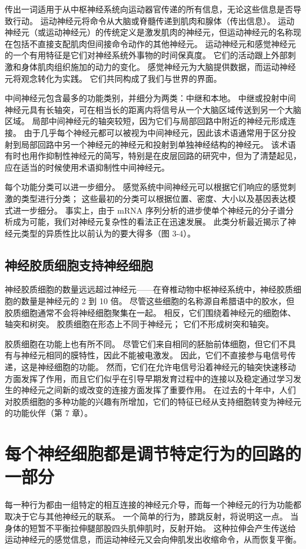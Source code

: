 传出一词适用于从中枢神经系统向运动器官传递的所有信息，无论这些信息是否导致行动。 运动神经元将命令从大脑或脊髓传递到肌肉和腺体（传出信息）。 运动神经元（或运动神经元）的传统定义是激发肌肉的神经元，但运动神经元的名称现在包括不直接支配肌肉但间接命令动作的其他神经元。 运动神经元和感觉神经元的一个有用特征是它们对神经系统外事物的时间保真度。 它们的活动跟上外部刺激和身体肌肉组织施加的动力的变化。 感觉神经元为大脑提供数据，而运动神经元将观念转化为实践。 它们共同构成了我们与世界的界面。

中间神经元包含最多的功能类别，并细分为两类：中继和本地。 中继或投射中间神经元具有长轴突，可在相当长的距离内将信号从一个大脑区域传送到另一个大脑区域。 局部中间神经元的轴突较短，因为它们与局部回路中附近的神经元形成连接。 由于几乎每个神经元都可以被视为中间神经元，因此该术语通常用于区分投射到局部回路中另一个神经元的神经元和投射到单独神经结构的神经元。 该术语有时也用作抑制性神经元的简写，特别是在皮层回路的研究中，但为了清楚起见，应在适当的时候使用术语抑制性中间神经元。

每个功能分类可以进一步细分。 感觉系统中间神经元可以根据它们响应的感觉刺激的类型进行分类； 这些最初的分类可以根据位置、密度、大小以及基因表达模式进一步细分。 事实上，由于 mRNA 序列分析的进步使单个神经元的分子谱分析成为可能，我们对神经元复杂性的看法正在迅速发展。 此类分析最近揭示了神经元类型的异质性比以前认为的要大得多（图 3-4）。

\subsection{神经胶质细胞支持神经细胞}
神经胶质细胞的数量远远超过神经元——在脊椎动物中枢神经系统中，神经胶质细胞的数量是神经元的 2 到 10 倍。 尽管这些细胞的名称源自希腊语中的胶水，但胶质细胞通常不会将神经细胞聚集在一起。 相反，它们围绕着神经元的细胞体、轴突和树突。 胶质细胞在形态上不同于神经元； 它们不形成树突和轴突。

胶质细胞在功能上也有所不同。 尽管它们来自相同的胚胎前体细胞，但它们不具有与神经元相同的膜特性，因此不能被电激发。 因此，它们不直接参与电信号传递，这是神经细胞的功能。 然而，它们在允许电信号沿着神经元的轴突快速移动方面发挥了作用，而且它们似乎在引导早期发育过程中的连接以及稳定通过学习发生的神经元之间新的或改变的连接方面发挥了重要作用。 在过去的十年中，人们对胶质细胞的多种功能的兴趣有所增加，它们的特征已经从支持细胞转变为神经元的功能伙伴（第 7 章）。

\section{每个神经细胞都是调节特定行为的回路的一部分}
每一种行为都由一组特定的相互连接的神经元介导，而每一个神经元的行为功能都取决于它与其他神经元的联系。 一个简单的行为，膝跳反射，将说明这一点。 当身体的短暂不平衡拉伸腿部股四头肌伸肌时，反射开始。 这种拉伸会产生传送给运动神经元的感觉信息，而运动神经元又会向伸肌发出收缩命令，从而恢复平衡。

